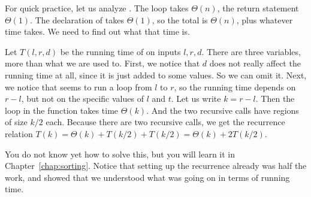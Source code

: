 For quick practice, let us analyze .
The loop takes $\Theta(n)$, the return statement $\Theta(1)$.
The declaration of  takes $\Theta(1)$, so the total
is $\Theta(n)$, plus whatever time  takes. 
We need to find out what that time is.

Let $T(l, r, d)$ be the running time of  on inputs $l, r, d$.
There are three variables, more than what we are used to.
First, we notice that $d$ does not really affect the running time at
all, since it is just added to some values. So we can omit it.
Next, we notice that  seems to run a loop from $l$ to $r$,
so the running time depends on $r-l$, but not on the specific values
of $l$ and $t$. Let us write $k=r-l$.
Then the  loop in the function takes time $\Theta(k)$.
And the two recursive calls have regions of size $k/2$ each.
Because there are two recursive calls, we get the recurrence
relation $T(k) = \Theta(k) + T(k/2) + T(k/2) = \Theta(k) + 2T(k/2)$.

You do not know yet how to solve this, but you will learn it in
Chapter~\ref{chap:sorting}.
Notice that setting up the recurrence already was half the work,
and showed that we understood what was going on in terms of
running time.